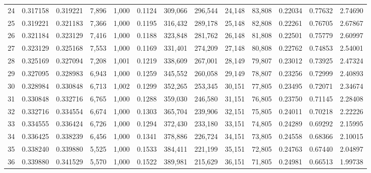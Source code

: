 \begin{tabular}{rrrrrrrrrrrrr}
24  &  0.317158 &  0.319221 &   7,896 &  1,000 &                                     0.1124 &  309,066 &  296,544 &   24,148 &   83,808 &  0.22034 &  0.77632 &  2.74690 \\
25  &  0.319221 &  0.321183 &   7,366 &  1,000 &                                     0.1195 &  316,432 &  289,178 &   25,148 &   82,808 &  0.22261 &  0.76705 &  2.67867 \\
26  &  0.321184 &  0.323129 &   7,416 &  1,000 &                                     0.1188 &  323,848 &  281,762 &   26,148 &   81,808 &  0.22501 &  0.75779 &  2.60997 \\
27  &  0.323129 &  0.325168 &   7,553 &  1,000 &                                     0.1169 &  331,401 &  274,209 &   27,148 &   80,808 &  0.22762 &  0.74853 &  2.54001 \\
28  &  0.325169 &  0.327094 &   7,208 &  1,001 &                                     0.1219 &  338,609 &  267,001 &   28,149 &   79,807 &  0.23012 &  0.73925 &  2.47324 \\
29  &  0.327095 &  0.328983 &   6,943 &  1,000 &                                     0.1259 &  345,552 &  260,058 &   29,149 &   78,807 &  0.23256 &  0.72999 &  2.40893 \\
30  &  0.328984 &  0.330848 &   6,713 &  1,002 &                                     0.1299 &  352,265 &  253,345 &   30,151 &   77,805 &  0.23495 &  0.72071 &  2.34674 \\
31  &  0.330848 &  0.332716 &   6,765 &  1,000 &                                     0.1288 &  359,030 &  246,580 &   31,151 &   76,805 &  0.23750 &  0.71145 &  2.28408 \\
32  &  0.332716 &  0.334554 &   6,674 &  1,000 &                                     0.1303 &  365,704 &  239,906 &   32,151 &   75,805 &  0.24011 &  0.70218 &  2.22226 \\
33  &  0.334555 &  0.336424 &   6,726 &  1,000 &                                     0.1294 &  372,430 &  233,180 &   33,151 &   74,805 &  0.24289 &  0.69292 &  2.15995 \\
34  &  0.336425 &  0.338239 &   6,456 &  1,000 &                                     0.1341 &  378,886 &  226,724 &   34,151 &   73,805 &  0.24558 &  0.68366 &  2.10015 \\
35  &  0.338240 &  0.339880 &   5,525 &  1,000 &                                     0.1533 &  384,411 &  221,199 &   35,151 &   72,805 &  0.24763 &  0.67440 &  2.04897 \\
36  &  0.339880 &  0.341529 &   5,570 &  1,000 &                                     0.1522 &  389,981 &  215,629 &   36,151 &   71,805 &  0.24981 &  0.66513 &  1.99738 \\

\end{tabular}
